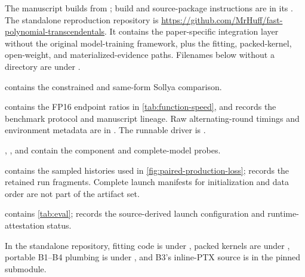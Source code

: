 The manuscript builds from ; build and source-package
instructions are in its . The standalone reproduction repository is
\url{https://github.com/MrHuff/fast-polynomial-transcendentals}. It contains the
paper-specific integration layer without the original model-training framework,
plus the fitting, packed-kernel, open-weight, and materialized-evidence paths.
Filenames below without a directory are under .

\begin{description}[leftmargin=1.55in,style=nextline]
    \item[Function error]
    contains the constrained and same-form Sollya comparison.

    \item[Isolated function timing]
     contains the FP16 endpoint
    ratios in \cref{tab:function-speed}, and
     records the
    benchmark protocol and manuscript lineage. Raw alternating-round timings
    and environment metadata are in
    . The runnable driver is
    .

    \item[Integrated timing]
    ,
    , and
     contain the component and
    complete-model probes.

    \item[Paired pre-training]
     contains the sampled histories used in
    \cref{fig:paired-production-loss};
     records the retained run
    fragments. Complete launch manifests for initialization and data order are
    not part of the artifact set.

    \item[Open-weight evaluation]
     contains \cref{tab:eval};
     records the source-derived launch
    configuration and runtime-attestation status.

    \item[Implementations]
    In the standalone repository, fitting code is under
    , packed kernels are under
    , portable B1--B4 plumbing is under
    , and B3's inline-PTX source is in the pinned
     submodule.
\end{description}

